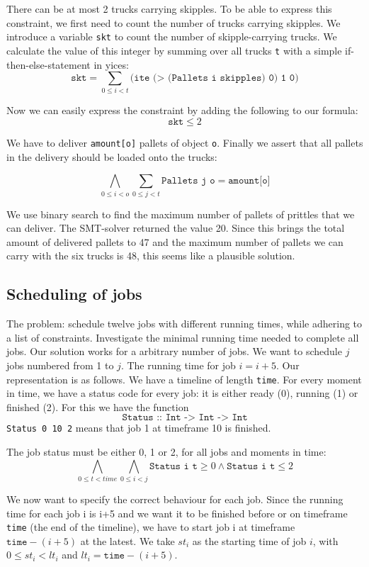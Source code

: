 \documentclass[12pt]{article}
\begin{document}
There can be at most 2 trucks carrying skipples. To be able to express this constraint, we first need to count the number of trucks carrying skipples. We introduce a variable \texttt{skt} to count the number of skipple-carrying trucks. We calculate the value of this integer by summing over all trucks \texttt{t} with a simple if-then-else-statement in yices: 
\[ \texttt{skt} = \sum_{0\le i < t} \texttt{(ite (> (Pallets i skipples) 0) 1 0)}\]

Now we can easily express the constraint by adding the following to our formula:
\[ \texttt{skt} \le 2 \]

We have to deliver \texttt{amount[o]} pallets of object \texttt{o}. Finally we assert that all pallets in the delivery should be loaded onto the trucks:

\[ \bigwedge_{0 \le i < o} \sum_{0 \le j < t} \texttt{Pallets j o} = \texttt{amount[o]}\]

We use binary search to find the maximum number of pallets of prittles that we can deliver. The SMT-solver returned the value 20. Since this brings the total amount of delivered pallets to 47 and the maximum number of pallets we can carry with the six trucks is 48, this seems like a plausible solution.

\subsection*{Scheduling of jobs}
The problem: schedule twelve jobs with different running times, while adhering to a list of constraints. Investigate the minimal running time needed to complete all jobs.
Our solution works for a arbitrary number of jobs. We want to schedule $j$ jobs numbered from 1 to $j$. The running time for job $i = i+5$.
Our representation is as follows. We have a timeline of length \texttt{time}. For every moment in time, we have a status code for every job: it is either ready (0), running (1) or finished (2). 
For this we have the function 
\[\texttt{Status :: Int -> Int -> Int}\]
\texttt{Status 0 10 2} means that job 1 at timeframe 10 is finished. 

The job status must be either 0, 1 or 2, for all jobs and moments in time:
\[ \bigwedge_{0 \le t < time} \bigwedge_{0 \le i < j} \texttt{Status i t} \ge 0\wedge \texttt{Status i t} \le 2\]

We now want to specify the correct behaviour for each job. 
Since the running time for each job i is i+5 and we want it to be finished before or on timeframe \texttt{time} (the end of the timeline), we have to start job i at timeframe $\texttt{time}-(i+5)$ at the latest.
We take $st_i$ as the starting time of job $i$, with $0 \le st_i < lt_i$ and $lt_i = \texttt{time}-(i+5)$.
\end{document}
